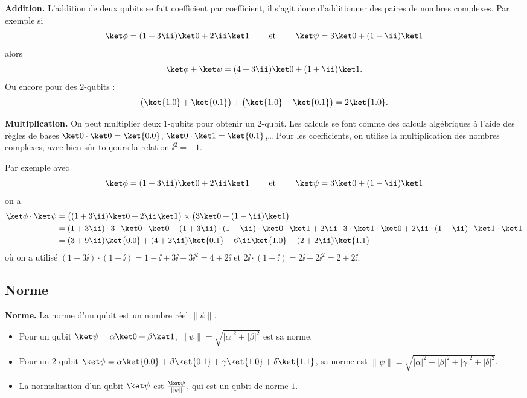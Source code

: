 \documentclass[11pt,class=report,crop=false]{standalone}
\begin{document}
\textbf{Addition.}
L'addition de deux qubits se fait coefficient par coefficient,  il s'agit donc d'additionner des paires de nombres complexes. Par exemple
si 
$$\ket\phi = (1+3\ii)\ket0 + 2\ii\ket1 \qquad \text{ et } \qquad
\ket\psi = 3\ket0 + (1-\ii) \ket1$$
alors
$$\ket\phi + \ket\psi  = (4+3\ii)\ket0 + (1+\ii)\ket1.$$
Ou encore pour des $2$-qubits :
$$\big(\ket{1.0}+\ket{0.1}\big) + \big(\ket{1.0}-\ket{0.1}\big) = 2\ket{1.0}.$$

\bigskip
\textbf{Multiplication.}
On peut multiplier deux $1$-qubits pour obtenir un $2$-qubit. Les calculs se font comme des calculs algébriques à l'aide des règles de bases $\ket0 \cdot \ket 0 = \ket{0.0}$, $\ket0 \cdot \ket 1 = \ket{0.1}$,\ldots{} 
Pour les coefficients, on utilise la multiplication des nombres complexes, avec bien sûr toujours la relation $\ii^2=-1$.

Par exemple avec $$\ket\phi = (1+3\ii)\ket0 + 2\ii\ket1 \qquad \text{ et } \qquad
\ket\psi = 3\ket0 + (1-\ii) \ket1$$
on a
\begin{align*}
\ket\phi \cdot \ket\psi
  &=\big((1+3\ii)\ket0 + 2\ii\ket1\big) \times \big(3\ket0 + (1-\ii) \ket1\big) \\
  &= (1+3\ii)\cdot3\cdot\ket0\cdot\ket0 
  + (1+3\ii)\cdot(1-\ii)\cdot\ket0\cdot\ket1+
    2\ii\cdot 3\cdot\ket1\cdot\ket0 + 2\ii\cdot(1-\ii)\cdot \ket1\cdot\ket1\\
  &= (3+9\ii)\ket{0.0}  + (4+2\ii)\ket{0.1} + 6\ii\ket{1.0}+(2+2\ii)\ket{1.1}
\end{align*}
où on a utilisé $(1+3\ii) \cdot (1-\ii) = 1-\ii+3\ii-3\ii^2 = 4+2\ii$ et $2\ii\cdot(1-\ii) = 2\ii-2\ii^2 = 2+2\ii$.

\subsection{Norme}


\textbf{Norme.}
La norme d'un qubit est un nombre réel $\|\psi\|$.
\begin{itemize}
  \item Pour un qubit $\ket\psi = \alpha\ket0+\beta\ket1$, $\|\psi\| = \sqrt{|\alpha|^2+|\beta|^2}$ est sa norme.
  \item Pour un 2-qubit $\ket\psi = \alpha\ket{0.0}+\beta\ket{0.1}+\gamma\ket{1.0}+\delta\ket{1.1}$, sa norme est $\|\psi\| = \sqrt{|\alpha|^2+|\beta|^2+|\gamma|^2+|\delta|^2}$.
  \item La normalisation d'un qubit $\ket\psi$ est $\frac{\ket\psi}{\|\psi\|}$, qui  est un qubit de norme $1$.
\end{itemize}
\end{document}
